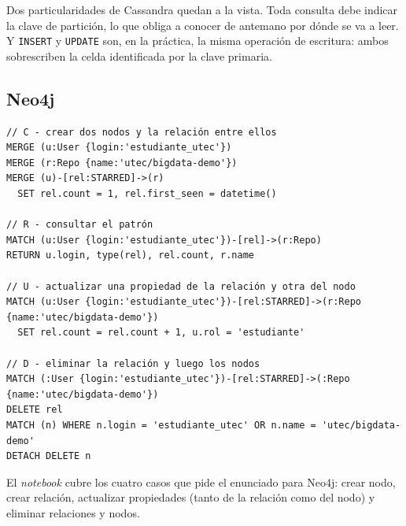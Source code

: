 Dos particularidades de Cassandra quedan a la vista. Toda consulta debe indicar la clave de partición, lo que obliga a conocer de antemano por dónde se va a leer. Y \texttt{INSERT} y \texttt{UPDATE} son, en la práctica, la misma operación de escritura: ambos sobrescriben la celda identificada por la clave primaria.

\subsection{Neo4j}

\begin{lstlisting}[style=plano]
// C - crear dos nodos y la relación entre ellos
MERGE (u:User {login:'estudiante_utec'})
MERGE (r:Repo {name:'utec/bigdata-demo'})
MERGE (u)-[rel:STARRED]->(r)
  SET rel.count = 1, rel.first_seen = datetime()

// R - consultar el patrón
MATCH (u:User {login:'estudiante_utec'})-[rel]->(r:Repo)
RETURN u.login, type(rel), rel.count, r.name

// U - actualizar una propiedad de la relación y otra del nodo
MATCH (u:User {login:'estudiante_utec'})-[rel:STARRED]->(r:Repo {name:'utec/bigdata-demo'})
  SET rel.count = rel.count + 1, u.rol = 'estudiante'

// D - eliminar la relación y luego los nodos
MATCH (:User {login:'estudiante_utec'})-[rel:STARRED]->(:Repo {name:'utec/bigdata-demo'})
DELETE rel
MATCH (n) WHERE n.login = 'estudiante_utec' OR n.name = 'utec/bigdata-demo'
DETACH DELETE n
\end{lstlisting}

El \textit{notebook} cubre los cuatro casos que pide el enunciado para Neo4j: crear nodo, crear relación, actualizar propiedades (tanto de la relación como del nodo) y eliminar relaciones y nodos.
